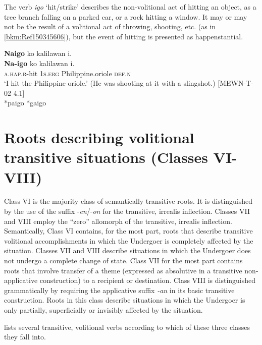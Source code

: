 The verb \textit{igo} ‘hit/strike’ describes the non-volitional act of hitting an object, as a tree branch falling on a parked car, or a rock hitting a window. It may or may not be the result of a volitional act of throwing, shooting, etc. (as in \ref{bkm:Ref150345606}), but the event of hitting is presented as happenstantial. 

\ea
\label{bkm:Ref150345606}
\textbf{Naigo}  ko  kalilawan  i. \\\smallskip
\gll \textbf{Na-igo}  ko  kalilawan  i. \\
\textsc{a.hap.r}-hit  1\textsc{s.erg}  Philippine.oriole  \textsc{def.n} \\
\glt ‘I hit the Philippine oriole.’ (He was shooting at it with a slingshot.) [MEWN-T-02 4.1] \\\smallskip
*paigo *gaigo
\z

\section{Roots describing volitional transitive situations (Classes VI-VIII)}
\label{bkm:Ref150248001}
\label{sec:volitionaltransitiveroots}

Class VI is the majority class of semantically transitive roots. It is distinguished by the use of the suffix -\textit{en}/-\textit{on} for the transitive, irrealis inflection. Classes VII and VIII employ the “zero” allomorph of the transitive, irrealis inflection. Semantically, Class VI contains, for the most part, roots that describe transitive volitional accomplishments in which the Undergoer is completely affected by the situation.  Classes VII and VIII describe situations in which the Undergoer does not undergo a complete change of state. Class VII for the most part contains roots that involve transfer of a theme (expressed as absolutive in a transitive non-applicative construction) to a recipient or destination. Class VIII is distinguished grammatically by requiring the applicative suffix \textit{{}-an} in its basic transitive construction. Roots in this class describe situations in which the Undergoer is only partially, superficially or invisibly affected by the situation.

 lists several transitive, volitional verbs according to which of these three classes they fall into. \\

